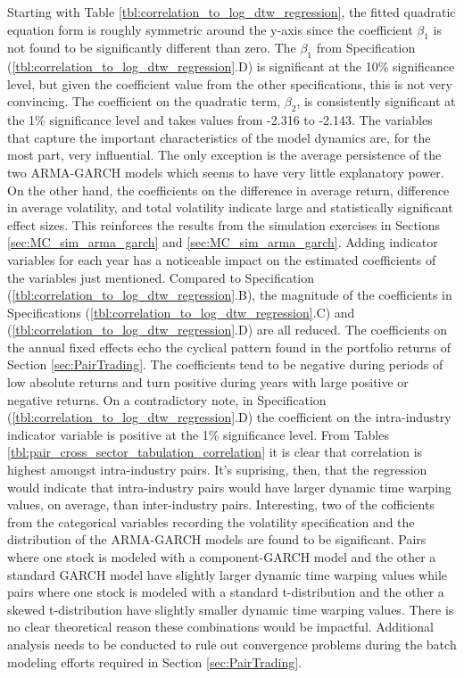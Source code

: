 Starting with Table \ref{tbl:correlation_to_log_dtw_regression}, the fitted quadratic equation form is roughly symmetric around the y-axis since the coefficient $\beta_{1}$ is not found to be significantly different than zero. The $\beta_{1}$ from Specification (\ref{tbl:correlation_to_log_dtw_regression}.D) is significant at the 10\% significance level, but given the coefficient value from the other specifications, this is not very convincing. The coefficient on the quadratic term, $\beta_{2}$, is consistently significant at the 1\% significance level and takes values from -2.316 to -2.143. The variables that capture the important characteristics of the model dynamics are, for the most part, very influential. The only exception is the average persistence of the two ARMA-GARCH models which seems to have very little explanatory power. On the other hand, the coefficients on the difference in average return, difference in average volatility, and total volatility indicate large and statistically significant effect sizes. This reinforces the results from the simulation exercises in Sections \ref{sec:MC_sim_arma_garch} and \ref{sec:MC_sim_arma_garch}. Adding indicator variables for each year has a noticeable impact on the estimated coefficients of the variables just mentioned. Compared to Specification (\ref{tbl:correlation_to_log_dtw_regression}.B), the magnitude of the coefficients in Specifications (\ref{tbl:correlation_to_log_dtw_regression}.C) and (\ref{tbl:correlation_to_log_dtw_regression}.D) are all reduced. The coefficients on the annual fixed effects echo the cyclical pattern found in the portfolio returns of Section \ref{sec:PairTrading}. The coefficients tend to be negative during periods of low absolute returns and turn positive during years with large positive or negative returns. On a contradictory note, in Specification (\ref{tbl:correlation_to_log_dtw_regression}.D) the coefficient on the intra-industry indicator variable is positive at the 1\% significance level. From Tables \ref{tbl:pair_cross_sector_tabulation_correlation} it is clear that correlation is highest amongst intra-industry pairs. It's suprising, then, that the regression would indicate that intra-industry pairs would have larger dynamic time warping values, on average, than inter-industry pairs. Interesting, two of the cofficients from the categorical variables recording the volatility specification and the distribution of the ARMA-GARCH models are found to be significant. Pairs where one stock is modeled with a component-GARCH model and the other a standard GARCH model have slightly larger dynamic time warping values while pairs where one stock is modeled with a standard t-distribution and the other a skewed t-distribution have slightly smaller dynamic time warping values. There is no clear theoretical reason these combinations would be impactful. Additional analysis needs to be conducted to rule out convergence problems during the batch modeling efforts required in Section \ref{sec:PairTrading}.

